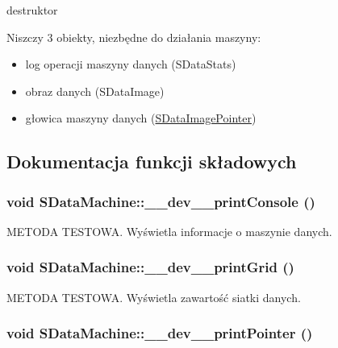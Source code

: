 destruktor 

Niszczy 3 obiekty, niezbędne do działania maszyny:\begin{itemize}
\item log operacji maszyny danych (SDataStats)\item obraz danych (SDataImage)\item głowica maszyny danych (\hyperlink{classSDataImagePointer}{SDataImagePointer}) \end{itemize}


\subsection{Dokumentacja funkcji składowych}
\hypertarget{classSDataMachine_da92c5d20a64279ff191059705c3070f}{
\subsubsection[{\_\-\_\-dev\_\-\_\-printConsole}]{\setlength{\rightskip}{0pt plus 5cm}void SDataMachine::\_\-\_\-dev\_\-\_\-printConsole ()}}
\label{classSDataMachine_da92c5d20a64279ff191059705c3070f}


METODA TESTOWA. Wyświetla informacje o maszynie danych. \hypertarget{classSDataMachine_ec760b755d01ea8c9ef3d37aa8f749d2}{
\subsubsection[{\_\-\_\-dev\_\-\_\-printGrid}]{\setlength{\rightskip}{0pt plus 5cm}void SDataMachine::\_\-\_\-dev\_\-\_\-printGrid ()}}
\label{classSDataMachine_ec760b755d01ea8c9ef3d37aa8f749d2}


METODA TESTOWA. Wyświetla zawartość siatki danych. \hypertarget{classSDataMachine_3d2383297382e73c4f61f7fc231c34b7}{
\subsubsection[{\_\-\_\-dev\_\-\_\-printPointer}]{\setlength{\rightskip}{0pt plus 5cm}void SDataMachine::\_\-\_\-dev\_\-\_\-printPointer ()}}
\label{classSDataMachine_3d2383297382e73c4f61f7fc231c34b7}


